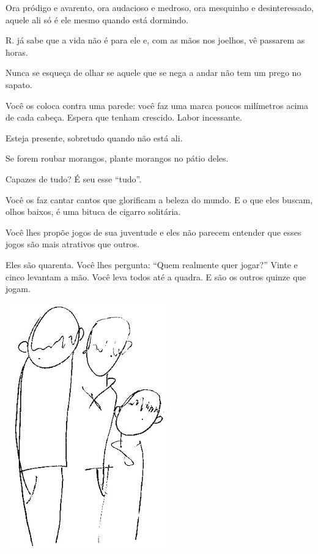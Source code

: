 Ora pródigo e avarento, ora audacioso e medroso, ora mesquinho e
desinteressado, aquele ali só é ele mesmo quando está dormindo.

\bigskip
\bigskip

R. já sabe que a vida não é para ele e, com as mãos nos joelhos, vê
passarem as horas.

\bigskip
\bigskip

Nunca se esqueça de olhar se aquele que se nega a andar não tem um prego
no sapato.

\bigskip
\bigskip

Você os coloca contra uma parede: você faz uma marca poucos milímetros
acima de cada cabeça. Espera que tenham crescido. Labor incessante.

\bigskip
\bigskip

Esteja presente, sobretudo quando não está ali.

\bigskip
\bigskip

Se forem roubar morangos, plante morangos no pátio deles.

\bigskip
\bigskip

Capazes de tudo? É seu esse ``tudo''.

\bigskip
\bigskip

Você os faz cantar cantos que glorificam a beleza do mundo. E o que eles
buscam, olhos baixos, é uma bituca de cigarro solitária.

\bigskip
\bigskip

Você lhes propõe jogos de sua juventude e eles não parecem entender que
esses jogos são mais atrativos que outros.

\bigskip
\bigskip

Eles são quarenta. Você lhes pergunta: ``Quem realmente quer jogar?''
Vinte e cinco levantam a mão.
Você leva todos até a quadra. E são os
outros quinze que jogam.

\begin{center}
\includegraphics[width=70mm]{./imgs/Image_6.jpg}
\end{center}

